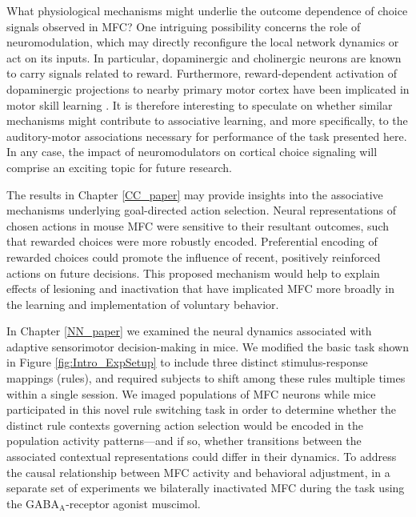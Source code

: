 What physiological mechanisms might underlie the outcome dependence of choice signals observed in MFC? One intriguing possibility concerns the role of neuromodulation, which may directly reconfigure the local network dynamics or act on its inputs. In particular, dopaminergic \citep{schultz1997neural} and cholinergic \citep{hangya2015central} neurons are known to carry signals related to reward. Furthermore, reward-dependent activation of dopaminergic projections to nearby primary motor cortex have been implicated in motor skill learning \citep{hosp2011dopaminergic, leemburg2018motor}. It is therefore interesting to speculate on whether similar mechanisms might contribute to associative learning, and more specifically, to the auditory-motor associations necessary for performance of the task presented here. In any case, the impact of neuromodulators on cortical choice signaling will comprise an exciting topic for future research.

The results in Chapter \ref{CC_paper} may provide insights into the associative mechanisms underlying goal-directed action selection. Neural representations of chosen actions in mouse MFC were sensitive to their resultant outcomes, such that rewarded choices were more robustly encoded. Preferential encoding of rewarded choices could promote the influence of recent, positively reinforced actions on future decisions. This proposed mechanism would help to explain effects of lesioning \citep{passingham1988premotor, gremel2013premotor} and inactivation \citep{siniscalchi2016fast, makino2017transformation} that have implicated MFC more broadly in the learning and implementation of voluntary behavior.


In Chapter \ref{NN_paper} we examined the neural dynamics associated with adaptive sensorimotor decision-making in mice. We modified the basic task shown in Figure \ref{fig:Intro_ExpSetup} to include three distinct stimulus-response mappings (rules), and required subjects to shift among these rules multiple times within a single session. We imaged populations of MFC neurons while mice participated in this novel rule switching task in order to determine whether the distinct rule contexts governing action selection would be encoded in the population activity patterns---and if so, whether transitions between the associated contextual representations could differ in their dynamics. To address the causal relationship between MFC activity and behavioral adjustment, in a separate set of experiments we bilaterally inactivated MFC during the task using the GABA$_\text{A}$-receptor agonist muscimol.  

